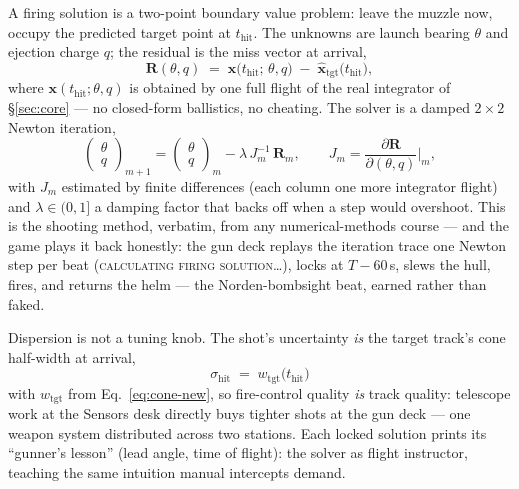 \documentclass[10pt,twocolumn]{article}
\newcommand{\vect}[1]{\mathbf{#1}}
\begin{document}
A firing solution is a two-point boundary value problem: leave the muzzle now, occupy the
predicted target point at $t_{\text{hit}}$. The unknowns are launch bearing $\theta$ and
ejection charge $q$; the residual is the miss vector at arrival,
\begin{equation}
\vect{R}(\theta, q) \;=\;
  \vect{x}\bigl(t_{\text{hit}};\, \theta, q\bigr)
  \;-\; \hat{\vect{x}}_{\text{tgt}}\bigl(t_{\text{hit}}\bigr),
\label{eq:residual}
\end{equation}
where $\vect{x}(t_{\text{hit}};\theta,q)$ is obtained by one full flight of the real
integrator of \S\ref{sec:core} --- no closed-form ballistics, no cheating. The solver is a
damped $2{\times}2$ Newton iteration,
\begin{equation}
\begin{pmatrix} \theta \\ q \end{pmatrix}_{m+1}
=
\begin{pmatrix} \theta \\ q \end{pmatrix}_{m}
- \lambda\, J_m^{-1}\, \vect{R}_m ,
\qquad
J_m = \frac{\partial \vect{R}}{\partial (\theta, q)}\bigg|_m ,
\label{eq:newton}
\end{equation}
with $J_m$ estimated by finite differences (each column one more integrator flight) and
$\lambda \in (0,1]$ a damping factor that backs off when a step would overshoot. This is
the shooting method, verbatim, from any numerical-methods course --- and the game plays it
back honestly: the gun deck replays the iteration trace one Newton step per beat
(\textsc{calculating firing solution\ldots}), locks at $T{-}60$\,s, slews the hull, fires,
and returns the helm --- the Norden-bombsight beat, earned rather than faked.

Dispersion is not a tuning knob. The shot's uncertainty \emph{is} the target track's cone
half-width at arrival,
\begin{equation}
\sigma_{\text{hit}} \;=\; w_{\text{tgt}}\bigl(t_{\text{hit}}\bigr)
\label{eq:dispersion}
\end{equation}
with $w_{\text{tgt}}$ from Eq.~\eqref{eq:cone-new}, so fire-control quality \emph{is}
track quality: telescope work at the Sensors desk directly buys tighter shots at the gun
deck --- one weapon system distributed across two stations. Each locked solution prints
its ``gunner's lesson'' (lead angle, time of flight): the solver as flight instructor,
teaching the same intuition manual intercepts demand.
\end{document}

